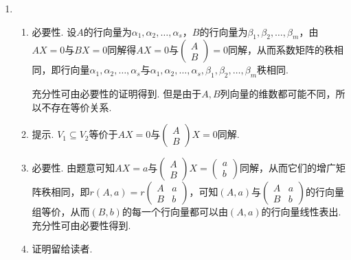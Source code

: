 \begin{enumerate}
    \item \begin{enumerate}
              \item 必要性. 设$A$的行向量为$\alpha_1,\alpha_2,\ldots,\alpha_s$，$B$的行向量为$\beta_1,\beta_2,\ldots,\beta_m$，由$AX=0$与$BX=0$同解得$AX=0$与$\begin{pmatrix}A \\ B\end{pmatrix}=0$同解，从而系数矩阵的秩相同，即行向量$\alpha_1,\alpha_2,\ldots,\alpha_s$与$\alpha_1,\alpha_2,\ldots,\alpha_s,\beta_1,\beta_2,\ldots,\beta_m$秩相同. %

                    充分性可由必要性的证明得到. 但是由于$A,B$列向量的维数都可能不同，所以不存在等价关系.

              \item 提示. $V_1\subseteq V_2$等价于$AX=0$与$\begin{pmatrix}
                            A \\
                            B
                        \end{pmatrix}X=0$同解.

              \item 必要性. 由题意可知$AX=a$与$\begin{pmatrix} A \\ B \end{pmatrix}X=\begin{pmatrix} a \\ b \end{pmatrix}$同解，从而它们的增广矩阵秩相同，即$r(A,a)=r\begin{pmatrix}
                            A & a \\
                            B & b
                        \end{pmatrix}$，可知$(A,a)$与$\begin{pmatrix}
                            A & a \\
                            B & b
                        \end{pmatrix}$的行向量组等价，从而$(B,b)$的每一个行向量都可以由$(A,a)$的行向量线性表出.\\
                    充分性可由必要性得到.

              \item 证明留给读者.
          \end{enumerate}
\end{enumerate}

\clearpage
